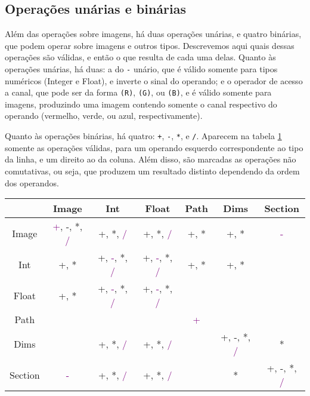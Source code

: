 \documentclass{article}
\begin{document}
\subsection{Operações unárias e binárias}
\label{sec:ops}
Além das operações sobre imagens, há duas operações unárias, e quatro binárias, que podem operar sobre imagens e outros tipos. Descrevemos aqui quais dessas operações são válidas, e então o que resulta de cada uma delas. Quanto às operações unárias, há duas: a do \texttt{-} unário, que é válido somente para tipos numéricos (Integer e Float), e inverte o sinal do operando; e o operador de acesso a canal, que pode ser da forma \texttt{(R)}, \texttt{(G)}, ou \texttt{(B)}, e é válido somente para imagens, produzindo uma imagem contendo somente o canal respectivo do operando (vermelho, verde, ou azul, respectivamente).

Quanto às operações binárias, há quatro: \texttt{+}, \texttt{-}, \texttt{*}, e \texttt{/}. Aparecem na tabela \ref{tab:binops} somente as operações válidas, para um operando esquerdo correspondente ao tipo da linha, e um direito ao da coluna. Além disso, são marcadas as operações não comutativas, ou seja, que produzem um resultado distinto dependendo da ordem dos operandos.

\begin{table}[]
\label{tab:binops}
\begin{tabular}{c|c|c|c|c|c|c|}
\cline{2-7}
 & Image & Int & Float & Path & Dims & Section \\ \hline
\multicolumn{1}{|c|}{Image} & \textcolor{purple}{+}, -, *, \textcolor{purple}{/} & +, *, \textcolor{purple}{/} & +, *, \textcolor{purple}{/} & +, * & +, * & \textcolor{purple}{-} \\ \hline
\multicolumn{1}{|c|}{Int} & +, * & +, \textcolor{purple}{-}, *, \textcolor{purple}{/} & +, \textcolor{purple}{-}, *, \textcolor{purple}{/} & +, * & +, * &  \\ \hline
\multicolumn{1}{|c|}{Float} & +, * & +, \textcolor{purple}{-}, *, \textcolor{purple}{/} & +, \textcolor{purple}{-}, *, \textcolor{purple}{/} &  &  &  \\ \hline
\multicolumn{1}{|c|}{Path} &  &  &  & \textcolor{purple}{+} &  &  \\ \hline
\multicolumn{1}{|c|}{Dims} &  & +, *, \textcolor{purple}{/} & +, *, \textcolor{purple}{/} &  & +, -, *, \textcolor{purple}{/} & * \\ \hline
\multicolumn{1}{|c|}{Section} & \textcolor{purple}{-} & +, *, \textcolor{purple}{/} & +, *, \textcolor{purple}{/} &  & * & +, -, *, \textcolor{purple}{/} \\ \hline
\end{tabular}
\end{table}
\end{document}
